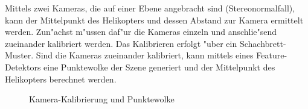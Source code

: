 \noindent Mittels zwei Kameras, die auf einer Ebene angebracht sind (Stereonormalfall), kann der Mittelpunkt des Helikopters und dessen Abstand zur Kamera ermittelt werden.\newline
Zun"achst m"ussen daf"ur die Kameras einzeln und anschlie"send zueinander kalibriert werden. Das Kalibrieren erfolgt "uber ein Schachbrett-Muster. Sind die Kameras zueinander kalibriert, kann mittels eines Feature-Detektors eine Punktewolke der Szene generiert und der Mittelpunkt des Helikopters berechnet werden.

\begin{figure}%
	\centering
	\qquad
	\caption{Kamera-Kalibrierung und Punktewolke}%
	\label{fig:extendetabstract}%
\end{figure}

